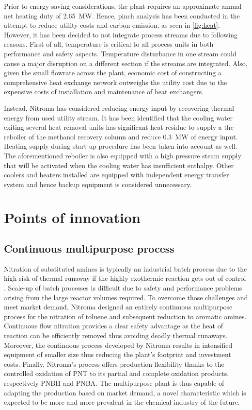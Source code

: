 Prior to energy saving considerations, the plant requires an approximate annual net heating duty of \SI{2.65}{\MW}. Hence, pinch analysis has been conducted in the attempt to reduce utility costs and carbon emission, as seen in \cref{fig:heat}. However, it has been decided to not integrate process streams due to following reasons. First of all, temperature is critical to all process units in both performance and safety aspects. Temperature disturbance in one stream could cause a major disruption on a different section if the streams are integrated. Also, given the small flowrate across the plant, economic cost of constructing a comprehensive heat exchange network outweighs the utility cost due to the expensive costs of installation and maintenance of heat exchangers.

 Instead, Nitroma has considered reducing energy input by recovering thermal energy from used utility stream. It has been identified that the cooling water exiting several heat removal units has significant heat residue to supply a the reboiler of the methanol recovery column and reduce \SI{0.3}{\MW} of energy input. Heating supply during start-up procedure has been taken into account as well. The aforementioned reboiler is also equipped with a high pressure steam supply that will be activated when the cooling water has insufficient enthalpy. Other coolers and heaters installed are equipped with independent energy transfer system and hence backup equipment is considered unnecessary.

\section{Points of innovation}

\subsection{Continuous multipurpose process}
Nitration of substituted amines is typically an industrial batch process due to the high risk of thermal runaway if the highly exothermic reaction gets out of control \cite{dugal_nitrobenzene_2005}. Scale-up of batch processes is difficult due to safety and performance problems arising from the large reactor volumes required. To overcome those challenges and meet market demand, Nitroma designed an entirely continuous multipurpose process for the nitration of toluene and subsequent reduction to aromatic amines. Continuous flow nitration provides a clear safety advantage as the heat of reaction can be efficiently removed thus avoiding deadly thermal runaways. Moreover, the continuous process developed by Nitroma results in intensified equipment of smaller size thus reducing the plant's footprint and investment costs. Finally, Nitroma's process offers production flexibility thanks to the controlled oxidation of PNT to its partial and complete oxidation products, respectively PNBH and PNBA. The multipurpose plant is thus capable of adapting the production based on market demand, a novel characteristic which is expected to be more and more prevalent in the chemical industry of the future.

